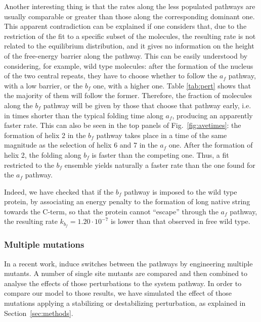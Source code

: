Another interesting thing is that the rates along the less populated pathways
are usually comparable or greater than those along the corresponding
dominant one. This apparent  contradiction can be explained if one considers
that, due to the restriction of the fit to a specific subset of the molecules,
the resulting rate is not related to the equilibrium distribution, and it gives
no information on the height of the free-energy barrier along the pathway. 
This can be easily understood by considering, for example, wild type molecules:
after the formation of the nucleus of the two central repeats, they have to
choose whether to follow the $a_f$ pathway, with a low barrier, or the $b_f$
one, with a higher one. Table \ref{tab:pert} shows that the majority of them
will follow the former. Therefore, the fraction of molecules along the $b_f$
pathway will be given by those that choose that pathway early, i.e. in times
shorter than the typical folding time along $a_f$, producing an apparently
faster rate. This can also be seen in the top panels of
Fig.~\ref{fig:avetimes}: the formation of helix 2 in the $b_f$ pathway takes
place in a time of the same magnitude as the selection of helix 6 and 7 in the
$a_f$ one. After the formation of helix 2, the folding along $b_f$ is faster
than the competing one. Thus, a fit restricted to the $b_f$ ensemble yields
naturally a faster rate than the one found for the $a_f$ pathway.

Indeed, we have checked that if the $b_f$ pathway is imposed  to the wild type
protein, by associating an energy penalty to the formation of long native string
towards the C-term, so that the protein cannot ``escape'' through the $a_f$
pathway, the resulting rate $k_{b_f}=1.20 \cdot 10^{-7}$ is lower than that
observed in free wild type.

\subsubsection{Multiple mutations}

In a recent work, \citet{Lowe2007} induce switches between the pathways
by engineering multiple mutants.
A number of single site mutants are compared and then combined to analyse the
effects of those perturbations to the system pathway.
In order to compare our model to those
results, we have simulated the effect of those mutations applying a stabilizing
or destabilizing perturbation, as explained in Section~\ref{sec:methods}.

